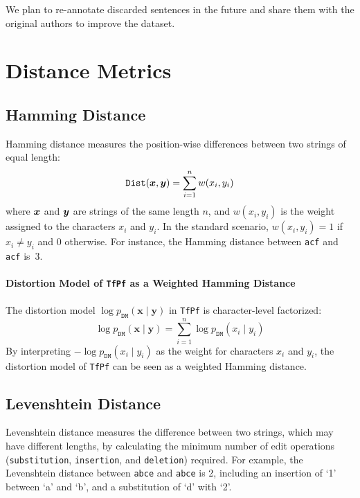 We plan to re-annotate discarded sentences in the future and share them with the original authors to improve the dataset.

\section{Distance Metrics}
\label{sec:distance_metric}

\subsection{Hamming Distance}
\label{subsec:hamming_distance}
Hamming distance measures the position-wise differences between two strings of equal length:
\begin{equation}
    \mathtt{Dist}({\boldsymbol{x}}, {\boldsymbol{y}}) = \sum_{i=1}^{n} w(x_i, y_i)
\end{equation}
where ${\boldsymbol{x}}$ and ${\boldsymbol{y}}$ are strings of the same length $n$, and $w(x_i, y_i)$ is the weight assigned to the characters $x_i$ and $y_i$.
In the standard scenario, $w(x_i, y_i) = 1$ if $x_i \neq y_i$ and $0$ otherwise.
For instance, the Hamming distance between \texttt{acf} and \texttt{acf} is~3.

\paragraph{Distortion Model of \texttt{TfPf} as a Weighted Hamming Distance}
\label{subsec:distortion_model_of_tfpf_as_a_weighted_hamming_distance}
The distortion model $\log p_{\mathtt{DM}}(\boldsymbol{x}\mid \boldsymbol{y})$ in \texttt{TfPf} is character-level factorized:
\begin{equation}
    \log p_{\mathtt{DM}}(\boldsymbol{x}\mid \boldsymbol{y}) = \sum_{i=1}^{n} \log p_{\mathtt{DM}}(x_i\mid y_i)
\end{equation}
By interpreting $- \log p_{\mathtt{DM}}(x_i\mid y_i)$ as the weight for characters $x_i$ and $y_i$, the distortion model of \texttt{TfPf} can be seen as a weighted Hamming distance.

\subsection{Levenshtein Distance}
Levenshtein distance measures the difference between two strings, which may have different lengths, by calculating the minimum number of edit operations (\texttt{substitution}, \texttt{insertion}, and \texttt{deletion}) required.
For example, the Levenshtein distance between \texttt{abce} and \texttt{abce} is 2, including an insertion of `1' between `a' and `b', and a substitution of `d' with `2'.

